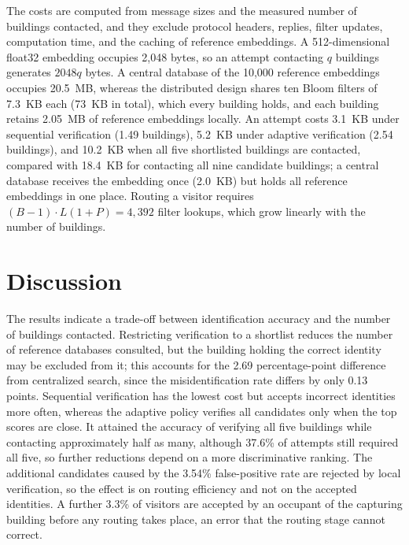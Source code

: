 \documentclass[pdflatex,sn-mathphys-num]{sn-jnl}%
\theoremstyle{thmstyleone}%
\theoremstyle{thmstyletwo}%
\theoremstyle{thmstylethree}%
\begin{document}
The costs are computed from message sizes and the measured number of buildings contacted, and they exclude protocol headers, replies, filter updates, computation time, and the caching of reference embeddings. A 512-dimensional float32 embedding occupies 2,048 bytes, so an attempt contacting $q$ buildings generates $2048q$ bytes. A central database of the 10,000 reference embeddings occupies 20.5~MB, whereas the distributed design shares ten Bloom filters of 7.3~KB each (73~KB in total), which every building holds, and each building retains 2.05~MB of reference embeddings locally. An attempt costs 3.1~KB under sequential verification (1.49 buildings), 5.2~KB under adaptive verification (2.54 buildings), and 10.2~KB when all five shortlisted buildings are contacted, compared with 18.4~KB for contacting all nine candidate buildings; a central database receives the embedding once (2.0~KB) but holds all reference embeddings in one place. Routing a visitor requires $(B-1)\cdot L(1+P)=4{,}392$ filter lookups, which grow linearly with the number of buildings.


\section{Discussion}
\label{sec:discussion}

The results indicate a trade-off between identification accuracy and the number of buildings contacted. Restricting verification to a shortlist reduces the number of reference databases consulted, but the building holding the correct identity may be excluded from it; this accounts for the 2.69 percentage-point difference from centralized search, since the misidentification rate differs by only 0.13 points. Sequential verification has the lowest cost but accepts incorrect identities more often, whereas the adaptive policy verifies all candidates only when the top scores are close. It attained the accuracy of verifying all five buildings while contacting approximately half as many, although 37.6\% of attempts still required all five, so further reductions depend on a more discriminative ranking. The additional candidates caused by the 3.54\% false-positive rate are rejected by local verification, so the effect is on routing efficiency and not on the accepted identities. A further 3.3\% of visitors are accepted by an occupant of the capturing building before any routing takes place, an error that the routing stage cannot correct.
\end{document}
